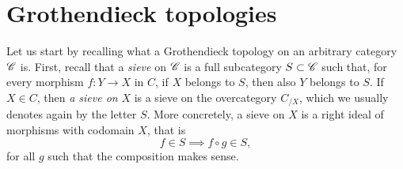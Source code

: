 \section{Grothendieck topologies}\label{SecGrothTop}
Let us start by recalling what a Grothendieck topology on an arbitrary category $\mathscr{C}$ is. First, recall that a \textit{sieve} on $\mathscr{C}$ is a full subcategory $S\subset \mathscr{C}$ such that, for every morphism $f : Y\to X$ in $C$, if $X$ belongs to $S$, then also $Y$ belongs to $S$. If $X\in C$, then \textit{a sieve on} $X$ is a sieve on the overcategory $C_{/X}$, which we usually denotes again by the letter $S$. More concretely, a sieve on $X$ is a right ideal of morphisms with codomain $X$, that is 
\begin{equation*}
	f\in S\implies f\circ g\in S, 
\end{equation*} 
for all $g$ such that the composition makes sense. 

